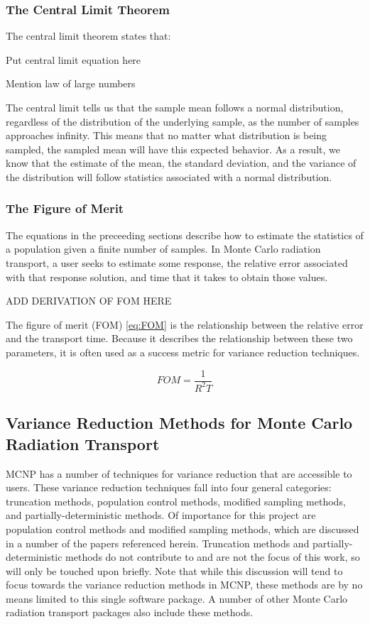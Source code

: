 \subsubsection{The Central Limit Theorem}
\label{subsubsec:CLT}

The central limit theorem states that:

Put central limit equation here

Mention law of large numbers

The central limit tells us that the sample mean follows a normal
distribution, regardless of the distribution of the underlying sample, as the
number of samples approaches infinity. This
means that no matter what distribution is being sampled, the sampled mean will
have this expected behavior. As a result, we know that the estimate of the mean,
the standard deviation, and the variance of the distribution will follow
statistics associated with a normal distribution.

\subsubsection{The Figure of Merit}
\label{subsubsec:FOM}

The equations in the preceeding sections describe how to estimate the statistics
of a population given a finite number of samples. In Monte Carlo radiation transport, a
user seeks to estimate some response, the relative error associated with that
response solution, and time that it takes to obtain those values.

ADD DERIVATION OF FOM HERE

The figure of merit (FOM) \eqref{eq:FOM}
is the relationship between the relative error and the
transport time. Because it describes the relationship between these two
parameters, it is often used as a success metric for variance
reduction techniques.

\begin{equation}
FOM=\frac { 1 }{ R^{ 2 }T }
\label{eq:FOM}
\end{equation}

\subsection{Variance Reduction Methods for Monte Carlo Radiation Transport}
\label{subsec:MCVR}
MCNP \cite{hendricks_mcnp_1985, brown_mcnp_2002} has a number of techniques for
variance
reduction that are accessible to users. These variance reduction
techniques fall
into four general categories: truncation methods, population control methods, modified
sampling methods, and partially-deterministic methods. Of importance for this
project are
population control methods and modified sampling methods, which are discussed in
a number
of the papers referenced herein. Truncation methods and partially-deterministic
methods do not contribute to and are not the focus of this work,
so will only be touched upon briefly. Note that while this
discussion will tend to focus towards the variance reduction methods in MCNP,
these
methods are by no means limited to this single software package. A
number of other Monte Carlo radiation transport packages also include these
methods.

